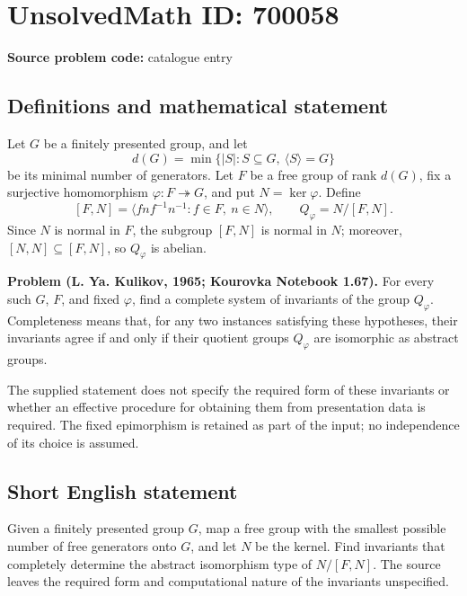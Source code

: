 \documentclass[11pt]{article}
\begin{document}
\section*{UnsolvedMath ID: 700058}
\textbf{Source problem code:} catalogue entry
\subsection{Definitions and mathematical statement}
Let \(G\) be a finitely presented group, and let
\[
d(G)=\min\{\lvert S\rvert:S\subseteq G,\ \langle S\rangle=G\}
\]
be its minimal number of generators. Let \(F\) be a free group of rank \(d(G)\), fix a surjective homomorphism \(\varphi:F\twoheadrightarrow G\), and put \(N=\ker\varphi\). Define
\[
[F,N]=\langle fnf^{-1}n^{-1}:f\in F,\ n\in N\rangle,
\qquad Q_{\varphi}=N/[F,N].
\]
Since \(N\) is normal in \(F\), the subgroup \([F,N]\) is normal in \(N\); moreover, \([N,N]\subseteq[F,N]\), so \(Q_{\varphi}\) is abelian.

\textbf{Problem (L. Ya. Kulikov, 1965; Kourovka Notebook 1.67).} For every such \(G\), \(F\), and fixed \(\varphi\), find a complete system of invariants of the group \(Q_{\varphi}\). Completeness means that, for any two instances satisfying these hypotheses, their invariants agree if and only if their quotient groups \(Q_{\varphi}\) are isomorphic as abstract groups.

The supplied statement does not specify the required form of these invariants or whether an effective procedure for obtaining them from presentation data is required. The fixed epimorphism is retained as part of the input; no independence of its choice is assumed.
\subsection{Short English statement}
Given a finitely presented group \(G\), map a free group with the smallest possible number of free generators onto \(G\), and let \(N\) be the kernel. Find invariants that completely determine the abstract isomorphism type of \(N/[F,N]\). The source leaves the required form and computational nature of the invariants unspecified.
\end{document}

